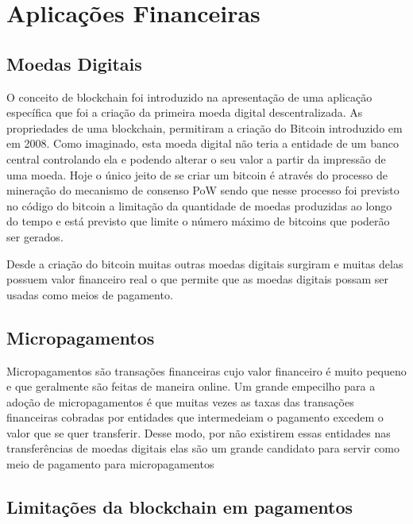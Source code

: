 \documentclass[12pt]{article}
\begin{document}
\section{Aplicações Financeiras}
\subsection{Moedas Digitais}

O conceito de blockchain foi introduzido na apresentação de uma aplicação específica que foi a criação da primeira moeda digital descentralizada. As propriedades de uma blockchain, permitiram a criação do Bitcoin introduzido em \cite{nakamoto2008peer} em 2008. Como imaginado, esta moeda digital não teria a entidade de um banco central controlando ela e podendo alterar o seu valor a partir da impressão de uma moeda. Hoje o único jeito de se criar um bitcoin é através do processo de mineração do mecanismo de consenso PoW sendo que nesse processo foi previsto no código do bitcoin a limitação da quantidade de moedas produzidas ao longo do tempo e está previsto que limite o número máximo de bitcoins que poderão ser gerados.

Desde a criação do bitcoin muitas outras moedas digitais surgiram e muitas delas possuem valor financeiro real o que permite que as moedas digitais possam ser usadas como meios de pagamento. 

\subsection{Micropagamentos}

Micropagamentos são transações financeiras cujo valor financeiro é muito pequeno e que geralmente são feitas de maneira online. Um grande empecilho para a adoção de micropagamentos é que muitas vezes as taxas das transações financeiras cobradas por entidades que intermedeiam o pagamento excedem o valor que se quer transferir. Desse modo, por não existirem essas entidades nas transferências de moedas digitais elas são um grande candidato para servir como meio de pagamento para micropagamentos

\subsection{Limitações da blockchain em pagamentos}
\end{document}
